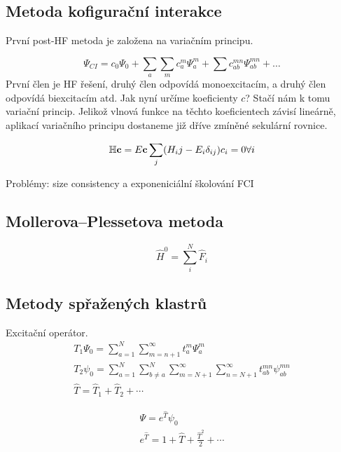 \subsection{Metoda kofigurační interakce}
První post-HF metoda je založena na variačním principu.

\begin{equation}
\Psi_{CI}=c_0\Psi_0+\sum_a\sum_m c_a^m\Psi_a^m+\sum c_{ab}^{mn}\Psi_{ab}^{mn}+\dots
\end{equation}
První člen je HF řešení, druhý člen odpovídá monoexcitacím, a druhý člen odpovídá biexcitacím atd.
Jak nyní určíme koeficienty $c$? Stačí nám k tomu variační princip. Jelikož vlnová funkce na těchto koeficientech závisí lineárně,
aplikací variačního principu dostaneme již dříve zmíněné sekulární rovnice.

\begin{equation}
\mathbb{H}\mathbf{c}=E\mathbf{c} \nonumber \\
\sum_j (H_ij-E_i\delta_{ij})c_i=0 \forall i 
\end{equation}

Problémy: size consistency a exponeniciální školování FCI

\subsection{Mollerova--Plessetova metoda}

\begin{equation}
\hat{H}^0=\sum_i^N\hat{F}_i
\end{equation}



\subsection{Metody spřažených klastrů}

Excitační operátor.
\begin{eqnarray}
T_1\Psi_0=\sum^N_{a=1}\sum_{m=n+1}^\infty t_a^m\Psi_a^m \\
T_2\psi_0=\sum_{a=1}^N \sum_{b\neq a}^N\sum_{m=N+1}^\infty \sum_{n=N+1}^\infty t_{ab}^{mn}\psi_{ab}^{mn} \\
\hat{T}=\hat{T}_1+\hat{T}_2+\cdots
\end{eqnarray}

\begin{eqnarray}
\Psi = e^{\hat{T}} \psi_0 \\
e^{\hat{T}} = 1+\hat{T}+\frac{\hat{T}^2}{2}+\cdots
\end{eqnarray}

